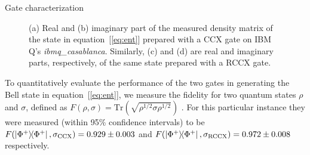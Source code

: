 \documentclass[final]{beamer}
\newlength{\colwidth}
\begin{document}
\begin{frame}[t]
\begin{columns}[t]
\begin{column}{\colwidth}
\begin{block}{Gate characterization}
\begin{figure}[htpb]
\begin{minipage}{11pc}
                        \end{minipage}
                        \label{fig:mat3d}
                        \caption{(a) Real  and (b) imaginary part of the measured density matrix of the state in equation~[\ref{eq:ent}] prepared with a CCX gate on IBM Q's \emph{ibmq\_casablanca}. Similarly, (c) and (d) are real and imaginary parts, respectively, of the same state prepared with a RCCX gate.}
                    \end{figure}
                    To quantitatively evaluate the performance of the two gates in generating the Bell state in equation~[\ref{eq:ent}], we measure the fidelity for two quantum states $\rho$ and $\sigma$, defined as $F(\rho, \sigma) = \mathrm{Tr}(\sqrt{\rho^{1/2} \sigma \rho^{1/2}})$ \cite{Mike&Ike}. For this particular instance they were measured (within 95\% confidence intervals) to be $F(\op{\Phi^{+}}{\Phi^{+}}, \sigma_\text{CCX}) = 0.929 \pm 0.003$ and $F(\op{\Phi^{+}}{\Phi^{+}}, \sigma_\text{RCCX}) = 0.972 \pm 0.008$ respectively.


\end{block}
\end{column}
\end{columns}
\end{frame}
\end{document}
